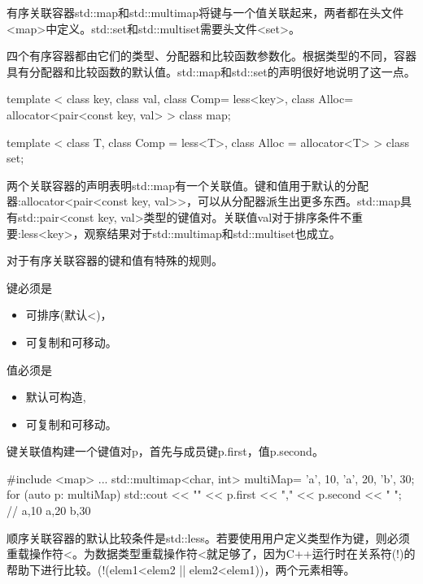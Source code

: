 


有序关联容器std::map和std::multimap将键与一个值关联起来，两者都在头文件<map>中定义。std::set和std::multiset需要头文件<set>。

四个有序容器都由它们的类型、分配器和比较函数参数化。根据类型的不同，容器具有分配器和比较函数的默认值。std::map和std::set的声明很好地说明了这一点。

\begin{cpp}
template < class key, class val, class Comp= less<key>,
		   class Alloc= allocator<pair<const key, val> >
class map;

template < class T, class Comp = less<T>,
		   class Alloc = allocator<T> >
class set;
\end{cpp}

两个关联容器的声明表明std::map有一个关联值。键和值用于默认的分配器:allocator<pair<const key, val>{}>，可以从分配器派生出更多东西。std::map具有std::pair<const key, val>类型的键值对。关联值val对于排序条件不重要:less<key>，观察结果对于std::multimap和std::multiset也成立。


对于有序关联容器的键和值有特殊的规则。

键必须是

\begin{itemize}
\item 
可排序(默认<)，

\item 
可复制和可移动。
\end{itemize}

值必须是

\begin{itemize}
\item 
默认可构造,

\item 
可复制和可移动。
\end{itemize}

键关联值构建一个键值对p，首先与成员键p.first，值p.second。

\begin{cpp}
#include <map>
...
std::multimap<char, int> multiMap= {{'a', 10}, {'a', 20}, {'b', 30}};
for (auto p: multiMap) std::cout << "{" << p.first << "," << p.second << "} ";
				// {a,10} {a,20} {b,30}
\end{cpp}


顺序关联容器的默认比较条件是std::less。若要使用用户定义类型作为键，则必须重载操作符<。为数据类型重载操作符<就足够了，因为C++运行时在关系符(!)的帮助下进行比较。(!(elem1<elem2 || elem2<elem1))，两个元素相等。

